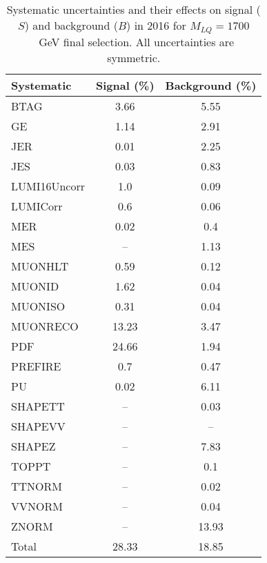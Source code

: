 \begin{table}[htbp]
\begin{center}
\caption{Systematic uncertainties and their effects on signal ($S$) and background ($B$) in 2016 for $M_{LQ}=1700$~GeV final selection. All uncertainties are symmetric.}
\begin{tabular}{lcc}
\hline\hline
Systematic & Signal (\%) & Background (\%) \\ \hline 
BTAG & 3.66 & 5.55\\ 
GE & 1.14 & 2.91\\ 
JER & 0.01 & 2.25\\ 
JES & 0.03 & 0.83\\ 
LUMI16Uncorr & 1.0 & 0.09\\ 
LUMICorr & 0.6 & 0.06\\ 
MER & 0.02 & 0.4\\ 
MES & -- & 1.13\\ 
MUONHLT & 0.59 & 0.12\\ 
MUONID & 1.62 & 0.04\\ 
MUONISO & 0.31 & 0.04\\ 
MUONRECO & 13.23 & 3.47\\ 
PDF & 24.66 & 1.94\\ 
PREFIRE & 0.7 & 0.47\\ 
PU & 0.02 & 6.11\\ 
SHAPETT & -- & 0.03\\ 
SHAPEVV & -- & --\\ 
SHAPEZ & -- & 7.83\\ 
TOPPT & -- & 0.1\\ 
TTNORM & -- & 0.02\\ 
VVNORM & -- & 0.04\\ 
ZNORM & -- & 13.93\\ 
Total & 28.33 & 18.85\\ \hline \hline
\end{tabular}
\label{tab:SysUncertainties_uujj_1700}
\end{center}
\end{table}

